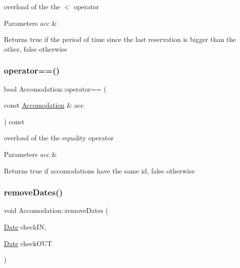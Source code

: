 overload of the the $<$ operator 


\begin{DoxyParams}{Parameters}
{\em acc} & \\
\hline
\end{DoxyParams}
\begin{DoxyReturn}{Returns}
true if the period of time since the last reservation is bigger than the other, false otherwise 
\end{DoxyReturn}
\hypertarget{class_accomodation_ae42299afc3f8bf211fe69821f876d48a}{}\label{class_accomodation_ae42299afc3f8bf211fe69821f876d48a} 
\subsubsection{\texorpdfstring{operator==()}{operator==()}}
{\footnotesize\ttfamily bool Accomodation\+::operator== (\begin{DoxyParamCaption}\item[{const \hyperlink{class_accomodation}{Accomodation} \&}]{acc }\end{DoxyParamCaption}) const}



overload of the the equality operator 


\begin{DoxyParams}{Parameters}
{\em acc} & \\
\hline
\end{DoxyParams}
\begin{DoxyReturn}{Returns}
true if accomodations have the same id, false otherwise 
\end{DoxyReturn}
\hypertarget{class_accomodation_ad77bdf46460657e8670001c91bce72b3}{}\label{class_accomodation_ad77bdf46460657e8670001c91bce72b3} 
\subsubsection{\texorpdfstring{remove\+Dates()}{removeDates()}}
{\footnotesize\ttfamily void Accomodation\+::remove\+Dates (\begin{DoxyParamCaption}\item[{\hyperlink{class_date}{Date}}]{check\+IN,  }\item[{\hyperlink{class_date}{Date}}]{check\+O\+UT }\end{DoxyParamCaption})}



